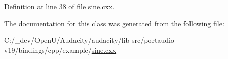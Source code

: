 Definition at line 38 of file sine.\+cxx.



The documentation for this class was generated from the following file\+:\begin{DoxyCompactItemize}
\item 
C\+:/\+\_\+dev/\+Open\+U/\+Audacity/audacity/lib-\/src/portaudio-\/v19/bindings/cpp/example/\hyperlink{sine_8cxx}{sine.\+cxx}\end{DoxyCompactItemize}
